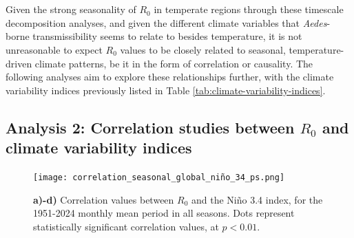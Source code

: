\documentclass[10pt,twocolumn]{wlscirep}
\begin{document}
\\
\\
Given the strong seasonality of $R_0$ in temperate regions through these timescale decomposition analyses, and given the different climate variables that \textit{Aedes}-borne transmissibility seems to relate to besides temperature, it is not unreasonable to expect $R_0$ values to be closely related to seasonal, temperature-driven climate patterns, be it in the form of correlation or causality. The following analyses aim to explore these relationships further, with the climate variability indices previously listed in Table \ref{tab:climate-variability-indices}.

\subsection{Analysis 2: Correlation studies between $R_0$ and climate variability indices} \label{sec-results-2} \label{sec-results-2}

\begin{figure}[!ht]
  \centering
  \texttt{[image: correlation\_seasonal\_global\_niño\_34\_ps.png]}
  \caption{\textbf{a)-d)} Correlation values between $R_0$ and the Niño 3.4 index, for the 1951-2024 monthly mean period in all seasons. Dots represent statistically significant correlation values, at $p < 0.01$.}
  \label{fig:global-correlation-niño-34}
\end{figure}
\end{document}
